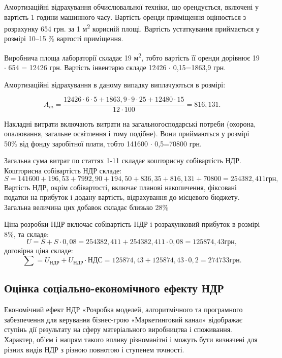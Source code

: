 Амортизаційні відрахування обчислювальної техніки, що орендується, включені у вартість 1 години машинного часу. Вартість оренди приміщення оцінюється з розрахунку 654 грн. за 1 м\textsuperscript{2} корисній площі. Вартість устаткування приймається у розмірі 10--15 \% вартості приміщення. 

Виробнича площа лабораторії складає 19 м\textsuperscript{2}, тобто вартість її оренди дорівнює 19 $\cdot$  654 = 12426 грн. Вартість інвентарю складе 12426 $\cdot$  0,15=1863,9 грн.

Амортизаційні відрахування в даному випадку виплачуються в розмірі:

\begin{equation}
A_m = \frac{12426  \cdot  6  \cdot  5+1863,9  \cdot  9  \cdot  25+12480  \cdot  15}{12  \cdot  100} = 816,131. \nonumber
\end{equation}

Накладні витрати включають витрати на загальногосподарські потреби (охорона, опалювання, загальне освітлення і тому подібне). Вони приймаються у розмірі 50\% від фонду заробітної плати, тобто 141600 $\cdot$  0,5=70800 грн. 

Загальна сума витрат по статтях 1-11 складає кошторисну собівартість НДР. Кошторисна собівартість НДР складе:
\begin{equation}
S = 141600+196,53+7992,90+194,50+836,35+816,131 + 70800 = 254382,411 грн	, \nonumber
\end{equation}
Вартість НДР, окрім собівартості, включає планові накопичення, фіксовані податки на прибуток і додану вартість, відрахування до місцевого бюджету. Загальна величина цих добавок складає близько 28\%

Ціна розробки НДР включає собівартість НДР і розрахунковий прибуток в розмірі 8\%, та складе:
\begin{equation}
U=S+S  \cdot  0,08 = 254382,411+254382,411  \cdot  0,08=125874,43 грн, \nonumber
\end{equation}
договірна ціна складе: 
\begin{equation}
\sum = U_{\text{НДР}} + U_{\text{НДР}} \cdot {\text{НДС}} = 125874,43+125874,43  \cdot  0,2=274733 грн. \nonumber
\end{equation}

\subsection{Оцінка соціально-економічного ефекту НДР}
Економічний ефект НДР «Розробка моделей, алгоритмічного та програмного забезпечення для керування бізнес-грою «Маркетинговий канал» відображає ступінь дії результату на сферу матеріального виробництва і споживання. Характер, об'єм і напрям такого впливу різноманітні і можуть бути визначені для різних видів НДР з різною повнотою і ступенем точності.

